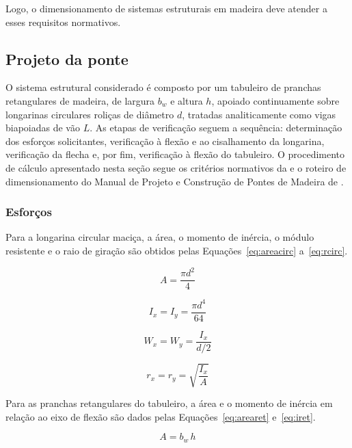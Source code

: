 Logo, o dimensionamento de sistemas estruturais em madeira deve atender a esses requisitos normativos.

\subsection{Projeto da ponte}\label{sec:projeto_ponte}

O sistema estrutural considerado é composto por um tabuleiro de pranchas retangulares de madeira, de largura $b_w$ e altura $h$, apoiado continuamente sobre longarinas circulares roliças de diâmetro $d$, tratadas analiticamente como vigas biapoiadas de vão $L$.
As etapas de verificação seguem a sequência: determinação dos esforços solicitantes, verificação à flexão e ao cisalhamento da longarina, verificação da flecha e, por fim, verificação à flexão do tabuleiro.
O procedimento de cálculo apresentado nesta seção segue os critérios normativos da \textcite{NBR7190-1:2022} e o roteiro de dimensionamento do Manual de Projeto e Construção de Pontes de Madeira de \textcite{CALIL2006}.

\subsubsection{Esforços}

Para a longarina circular maciça, a área, o momento de inércia, o módulo resistente e o raio de giração são obtidos pelas Equações~\eqref{eq:areacirc} a~\eqref{eq:rcirc}.

\begin{equation}
A = \frac{\pi d^2}{4}
\label{eq:areacirc}
\end{equation}

\begin{equation}
I_x = I_y = \frac{\pi d^4}{64}
\label{eq:icirc}
\end{equation}

\begin{equation}
W_x = W_y = \frac{I_x}{d/2}
\label{eq:wcirc}
\end{equation}

\begin{equation}
r_x = r_y = \sqrt{\frac{I_x}{A}}
\label{eq:rcirc}
\end{equation}

Para as pranchas retangulares do tabuleiro, a área e o momento de inércia em relação ao eixo de flexão são dados pelas Equações~\eqref{eq:arearet} e~\eqref{eq:iret}.

\begin{equation}
A = b_w\,h
\label{eq:arearet}
\end{equation}


